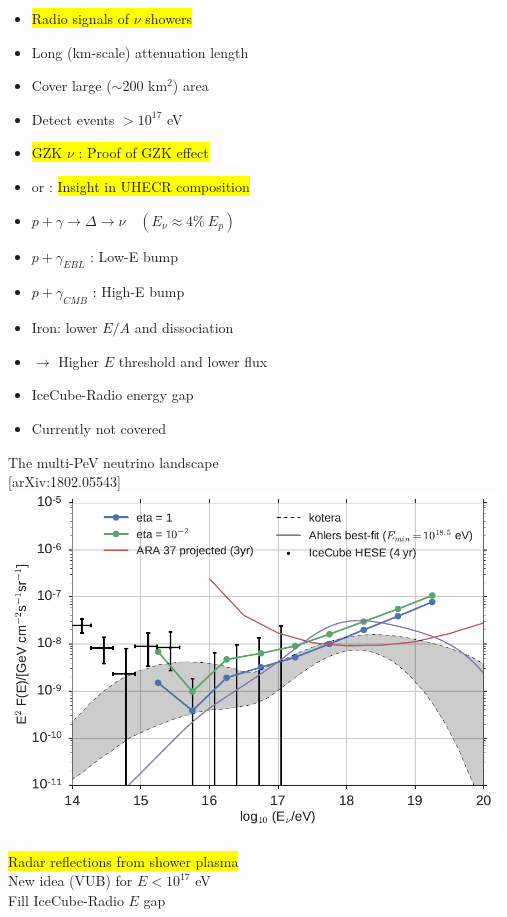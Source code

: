 \Tr
{}
\begin{itemize}
\item[] \colorbox{yellow}{Radio signals of $\nu$ showers}
\item Long (km-scale) attenuation length
\item[] Cover large ($\sim$200 km$^{2}$) area
\item {\blue Detect events $>10^{17}$ eV}
\item \colorbox{yellow}{GZK $\nu$ : Proof of GZK effect}
\item[] or : \colorbox{yellow}{Insight in UHECR composition}
\item $p+\gamma \rightarrow \Delta \rightarrow \nu \quad (E_{\nu} \approx 4\%~E_{p})$
\item[] $p+\gamma_{EBL}$ : Low-E bump
\item[] $p+\gamma_{CMB}$ : High-E bump
\item Iron: lower $E/A$ and dissociation
\item[] $\rightarrow$ Higher $E$ threshold and lower flux
\item {\blue IceCube-Radio energy gap}
\item[] Currently not covered
\end{itemize}

\newpage

\begin{center}
{\blue The multi-PeV neutrino landscape}\\
{\large [arXiv:1802.05543]}\\
\includegraphics[keepaspectratio,width=13cm]{radar}
\end{center}
\colorbox{yellow}{Radar reflections from shower plasma}\\
New idea (VUB) for $E<10^{17}$ eV\\
{\blue Fill IceCube-Radio $E$ gap}

